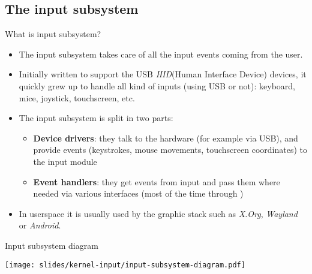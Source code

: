 \subsection{The input subsystem}

\begin{frame}{What is input subsystem?}
  \begin{itemize}
  \item The input subsystem takes care of all the input events coming
    from the user.
  \item Initially written to support the USB {\em HID}(Human Interface
    Device) devices, it quickly grew up to handle all kind of inputs
    (using USB or not): keyboard, mice, joystick, touchscreen, etc.
  \item The input subsystem is split in two parts:
    \begin{itemize}
    \item {\bf Device drivers}: they talk to the hardware (for example
      via USB), and provide events (keystrokes, mouse movements,
      touchscreen coordinates) to the input module
    \item {\bf Event handlers}: they get events from input and pass them
      where needed via various interfaces (most of the time through
      )
    \end{itemize}
  \item In userspace it is usually used by the graphic stack such
    as {\em X.Org}, {\em Wayland} or {\em Android}.
  \end{itemize}
\end{frame}

\begin{frame}{Input subsystem diagram}
  \begin{center}
    \texttt{[image: slides/kernel-input/input-subsystem-diagram.pdf]}
  \end{center}
\end{frame}

